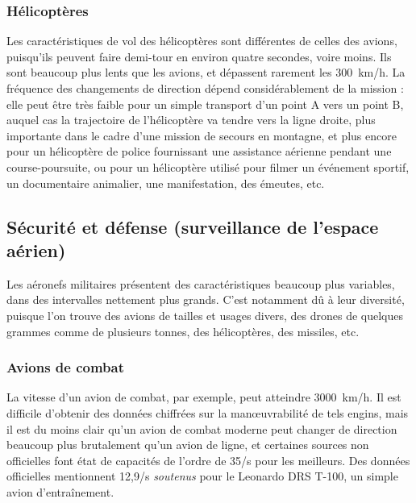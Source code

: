 	\subsubsection{Hélicoptères}
	Les caractéristiques de vol des hélicoptères sont différentes de celles des avions, puisqu'ils peuvent faire demi-tour en environ quatre secondes, voire moins. Ils sont beaucoup plus lents que les avions, et dépassent rarement les 300~km/h. La fréquence des changements de direction dépend considérablement de la mission : elle peut être très faible pour un simple transport d'un point A vers un point B, auquel cas la trajectoire de l'hélicoptère va tendre vers la ligne droite, plus importante dans le cadre d'une mission de secours en montagne, et plus encore pour un hélicoptère de police fournissant une assistance aérienne pendant une course-poursuite, ou pour un hélicoptère utilisé pour filmer un événement sportif, un documentaire animalier, une manifestation, des émeutes, etc.
	
	\subsection{Sécurité et défense (surveillance de l'espace aérien)}
	Les aéronefs militaires présentent des caractéristiques beaucoup plus variables, dans des intervalles nettement plus grands. C'est notamment dû à leur diversité, puisque l'on trouve des avions de tailles et usages divers, des drones de quelques grammes comme de plusieurs tonnes, des hélicoptères, des missiles, etc.
	
	\subsubsection{Avions de combat}
	La vitesse d'un avion de combat, par exemple, peut atteindre 3000~km/h\footnotemark{}. Il est difficile d'obtenir des données chiffrées sur la manœuvrabilité de tels engins, mais il est du moins clair qu'un avion de combat moderne peut changer de direction beaucoup plus brutalement qu'un avion de ligne, et certaines sources non officielles font état de capacités de l'ordre de 35\textdegree{}/s pour les meilleurs.\footnotemark{} Des données officielles mentionnent 12,9\textdegree{}/s \emph{soutenus} pour le Leonardo DRS T-100, un simple avion d'entraînement.\footnotemark{}
	
	\addtocounter{footnote}{-2}
	\addtocounter{footnote}{1}
	\addtocounter{footnote}{1}
	
